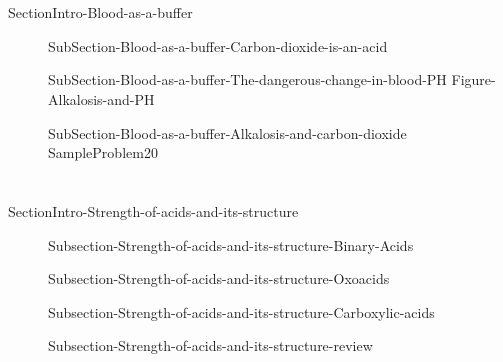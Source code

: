 \documentclass[main.tex]{subfiles}
\newcommand\chapterlabel{Ch-acidbase}\setcounter{figurenewcounter}{0}\setcounter{tablenewcounter}{0}\setcounter{formulanewcounter}{0}
\begin{document}
\newpage
\section{\color{blue!30!black}{Blood as a buffer}}{SectionIntro-Blood-as-a-buffer}
\sloppy
\begin{description}
\item[] {SubSection-Blood-as-a-buffer-Carbon-dioxide-is-an-acid}
\item[] 
{SubSection-Blood-as-a-buffer-The-dangerous-change-in-blood-PH}
  {Figure-Alkalosis-and-PH}
\item[] 
{SubSection-Blood-as-a-buffer-Alkalosis-and-carbon-dioxide}
   {SampleProblem20}
 \end{description}
 
 \section{\color{blue!30!black}{Molecular mechanisms behind acid-base strength}}{SectionIntro-Strength-of-acids-and-its-structure}
\sloppy\begin{description}
\item[] {Subsection-Strength-of-acids-and-its-structure-Binary-Acids}
\item[] {Subsection-Strength-of-acids-and-its-structure-Oxoacids}
\item[] {Subsection-Strength-of-acids-and-its-structure-Carboxylic-acids}
\item[] {Subsection-Strength-of-acids-and-its-structure-review}
 \end{description}
\end{document}
